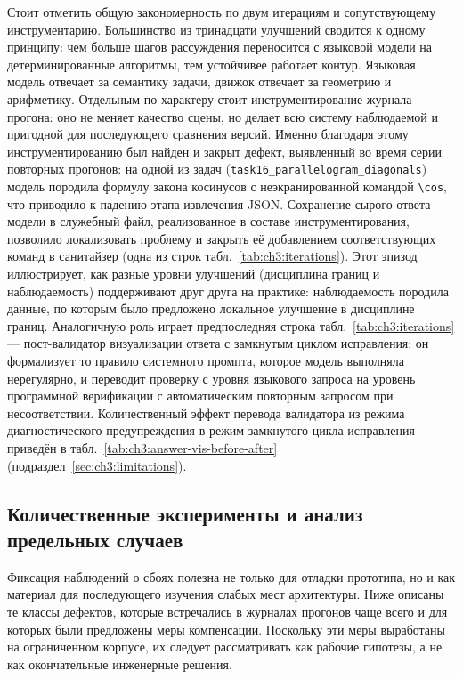 Стоит отметить общую закономерность по двум итерациям и сопутствующему инструментарию. Большинство из тринадцати улучшений сводится к одному принципу: чем больше шагов рассуждения переносится с языковой модели на детерминированные алгоритмы, тем устойчивее работает контур. Языковая модель отвечает за семантику задачи, движок отвечает за геометрию и арифметику. Отдельным по характеру стоит инструментирование журнала прогона: оно не меняет качество сцены, но делает всю систему наблюдаемой и пригодной для последующего сравнения версий. Именно благодаря этому инструментированию был найден и закрыт дефект, выявленный во время серии повторных прогонов: на одной из задач (\texttt{task16\_parallelogram\_diagonals}) модель породила формулу закона косинусов с неэкранированной командой \texttt{\textbackslash cos}, что приводило к падению этапа извлечения JSON. Сохранение сырого ответа модели в служебный файл, реализованное в составе инструментирования, позволило локализовать проблему и закрыть её добавлением соответствующих команд в санитайзер (одна из строк табл.~\ref{tab:ch3:iterations}). Этот эпизод иллюстрирует, как разные уровни улучшений (дисциплина границ и наблюдаемость) поддерживают друг друга на практике: наблюдаемость породила данные, по которым было предложено локальное улучшение в дисциплине границ. Аналогичную роль играет предпоследняя строка табл.~\ref{tab:ch3:iterations} --- пост-\allowbreak валидатор визуализации ответа с замкнутым циклом исправления: он формализует то правило системного промпта, которое модель выполняла нерегулярно, и переводит проверку с уровня языкового запроса на уровень программной верификации с автоматическим повторным запросом при несоответствии. Количественный эффект перевода валидатора из режима диагностического предупреждения в режим замкнутого цикла исправления приведён в табл.~\ref{tab:ch3:answer-vis-before-after} (подраздел~\ref{sec:ch3:limitations}).

\subsection{Количественные эксперименты и анализ предельных случаев}
\label{sec:ch3:limits}
\label{sec:ch3:limitations}

Фиксация наблюдений о сбоях полезна не только для отладки прототипа, но и как материал для последующего изучения слабых мест архитектуры. Ниже описаны те классы дефектов, которые встречались в журналах прогонов чаще всего и для которых были предложены меры компенсации. Поскольку эти меры выработаны на ограниченном корпусе, их следует рассматривать как рабочие гипотезы, а не как окончательные инженерные решения.


